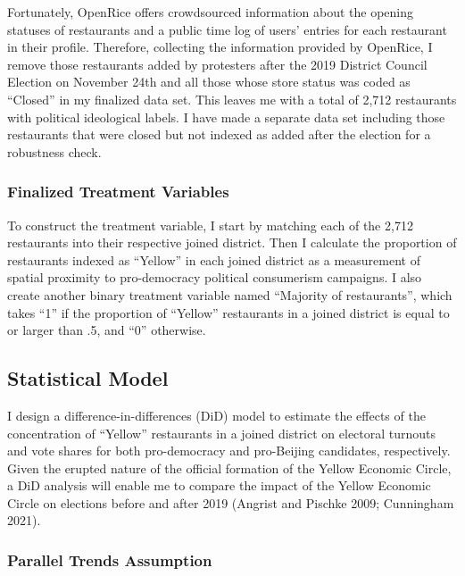 \documentclass[letterpaper, 12pt]{article}
\begin{document}
Fortunately, OpenRice offers crowdsourced information about the opening statuses of restaurants and a public time log of users' entries for each restaurant in their profile. Therefore, collecting the information provided by OpenRice, I remove those restaurants added by protesters after the 2019 District Council Election on November 24th and all those whose store status was coded as ``Closed'' in my finalized data set. This leaves me with a total of 2,712 restaurants with political ideological labels. I have made a separate data set including those restaurants that were closed but not indexed as added after the election for a robustness check.


\subsubsection{Finalized Treatment Variables}
To construct the treatment variable, I start by matching each of the 2,712 restaurants into their respective joined district. Then I calculate the proportion of restaurants indexed as ``Yellow'' in each joined district as a measurement of spatial proximity to pro-democracy political consumerism campaigns. I also create another binary treatment variable named ``Majority of restaurants'', which takes ``1'' if the proportion of ``Yellow'' restaurants in a joined district is equal to or larger than .5, and ``0'' otherwise.


\subsection{Statistical Model}
I design a difference-in-differences (DiD) model to estimate the effects of the concentration of ``Yellow'' restaurants in a joined district on electoral turnouts and vote shares for both pro-democracy and pro-Beijing candidates, respectively. Given the erupted nature of the official formation of the Yellow Economic Circle, a DiD analysis will enable me to compare the impact of the Yellow Economic Circle on elections before and after 2019 (Angrist and Pischke 2009; Cunningham 2021). 


\subsubsection{Parallel Trends Assumption}
\end{document}
